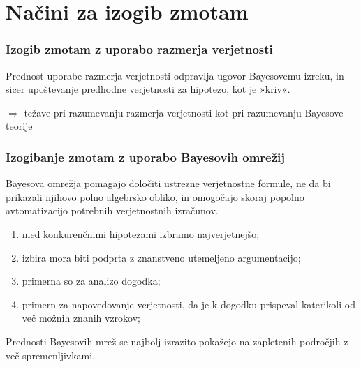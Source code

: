 \documentclass{beamer}
\begin{document}
\section{Načini za izogib zmotam}

\begin{frame}
    \frametitle{Izogib zmotam z uporabo razmerja verjetnosti}
    \begin{block}{Prednost uporabe razmerja verjetnosti}
        odpravlja ugovor Bayesovemu izreku, in sicer upoštevanje predhodne verjetnosti za hipotezo, kot je »kriv«.
    \end{block}\vspace{3mm}
    \centering
    $\Rightarrow$ težave pri razumevanju razmerja verjetnosti kot pri razumevanju Bayesove teorije
\end{frame}

\begin{frame}
    \frametitle{Izogibanje zmotam z uporabo Bayesovih omrežij}
    \begin{block}{}
        Bayesova omrežja pomagajo določiti ustrezne verjetnostne formule, ne da bi prikazali njihovo polno algebrsko obliko, in omogočajo skoraj popolno avtomatizacijo potrebnih verjetnostnih izračunov.
    \end{block} \vspace{3mm}
    \begin{enumerate}
        \item med konkurenčnimi hipotezami izbramo najverjetnejšo;
        \item izbira mora biti podprta z znanstveno utemeljeno argumentacijo;
        \item primerna so za analizo dogodka;
        \item primern za napovedovanje verjetnosti, da je k dogodku prispeval katerikoli od več možnih
        znanih vzrokov;
    \end{enumerate}
    \begin{block}{}
        Prednosti Bayesovih mrež se najbolj izrazito pokažejo na zapletenih področjih z več spremenljivkami.
    \end{block}
\end{frame}
\end{document}
